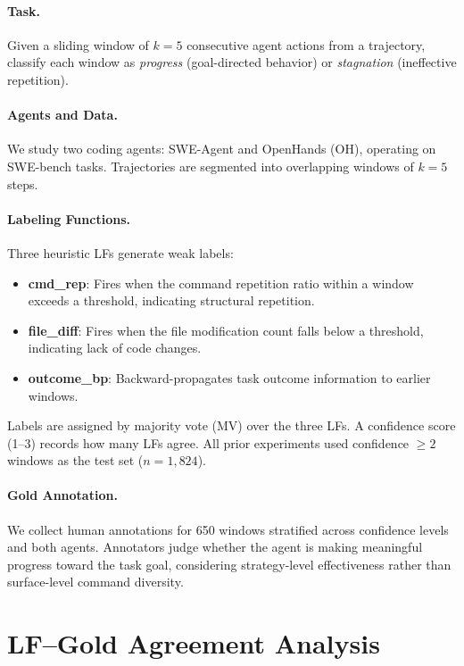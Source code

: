 \documentclass[11pt]{article}
\begin{document}
\paragraph{Task.} Given a sliding window of $k{=}5$ consecutive agent actions from a trajectory, classify each window as \emph{progress} (goal-directed behavior) or \emph{stagnation} (ineffective repetition).

\paragraph{Agents and Data.} We study two coding agents: SWE-Agent and OpenHands (OH), operating on SWE-bench tasks. Trajectories are segmented into overlapping windows of $k{=}5$ steps.

\paragraph{Labeling Functions.} Three heuristic LFs generate weak labels:
\begin{itemize}
\item \textbf{cmd\_rep}: Fires when the command repetition ratio within a window exceeds a threshold, indicating structural repetition.
\item \textbf{file\_diff}: Fires when the file modification count falls below a threshold, indicating lack of code changes.
\item \textbf{outcome\_bp}: Backward-propagates task outcome information to earlier windows.
\end{itemize}
Labels are assigned by majority vote (MV) over the three LFs. A confidence score (1--3) records how many LFs agree. All prior experiments used confidence $\geq 2$ windows as the test set ($n{=}1{,}824$).

\paragraph{Gold Annotation.} We collect human annotations for 650 windows stratified across confidence levels and both agents. Annotators judge whether the agent is making meaningful progress toward the task goal, considering strategy-level effectiveness rather than surface-level command diversity.

\section{LF--Gold Agreement Analysis}
\label{sec:agreement}
\end{document}
